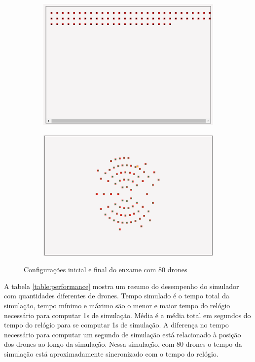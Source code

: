 \begin{figure}
    \centering
    \begin{subfigure}[b]{0.4\textwidth}
        \centering
        \includegraphics[width=\textwidth]{img/drone_swarm_init.png}
    \end{subfigure}
    \hfill
    \begin{subfigure}[b]{0.4\textwidth}
        \centering
        \includegraphics[width=\textwidth]{img/drone_swarm_end.png}
    \end{subfigure}
    \caption{Configurações inicial e final do enxame com 80 drones}
    \label{fig:drone_swarm}
\end{figure}

A tabela \ref{table:performance} mostra um resumo do desempenho do simulador com quantidades diferentes de drones. Tempo simulado é o tempo total da simulação, tempo mínimo e máximo são o menor e maior tempo do relógio necessário para computar 1s de simulação. Média é a média total em segundos do tempo do relógio para se computar 1s de simulação. A diferença no tempo necessário para computar um segundo de simulação está relacionado à posição dos drones ao longo da simulação. Nessa simulação, com 80 drones o tempo da simulação está aproximadamente sincronizado com o tempo do relógio.


